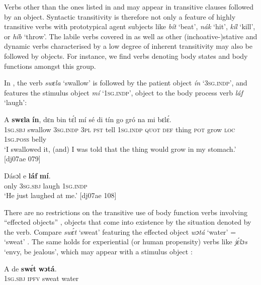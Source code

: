 Verbs other than the ones listed in  and  may appear in transitive clauses followed by an object. Syntactic transitivity is therefore not only a feature of highly transitive verbs with prototypical agent subjects like \textit{bít} ‘beat’, \textit{nák} ‘hit’, \textit{kíl} ‘kill’, or \textit{híb} ‘throw’. The labile verbs covered in  as well as other (inchoative-)stative and dynamic verbs characterised by a low degree of inherent transitivity may also be followed by objects. For instance, we find verbs denoting body states and body functions amongst this group.


In , the verb \textit{swɛla} ‘swallow’ is followed by the patient object \textit{ín} ‘\textsc{3sg.indp}’, and  features the stimulus object \textit{mí} ‘\textsc{1sg.indp}’, object to the body process verb \textit{láf} ‘laugh’: 



\ea%
    \label{ex:key:1101}
    \gll A    \textbf{swɛla}  \textbf{ín},    dɛn  bin  tɛ́l  mí    sé
di  tín    go  gró  na  mi    bɛlɛ́.\\
\textsc{1sg.sbj}  swallow  \textsc{3sg.indp}  \textsc{3pl}  \textsc{pst}  tell  \textsc{1sg.indp}  \textsc{quot}
\textsc{def}  thing  \textsc{pot} grow  \textsc{loc}  \textsc{1sg.poss}  belly\\

\glt ‘I swallowed it, (and) I was told that the thing would grow in my stomach.’ [dj07ae 079]
\z


\ea%
    \label{ex:key:1102}
    \gll Dásɔl  e    \textbf{láf}    \textbf{mí}.\\
only    \textsc{3sg.sbj}  laugh  \textsc{1sg.indp}\\

\glt ‘He just laughed at me.’ [dj07ae 108]
\z

There are no restrictions on the transitive use of body function verbs involving “effected objects{\fff}” \citep{Hopper1985}, objects that come into existence by the situation denoted by the verb. Compare \textit{swɛ́t} ‘sweat’ featuring the effected object{\fff} \textit{wɔtá} ‘water’ = ‘sweat’ . The same holds for experiential (or human propensity) verbs like \textit{jɛ́lɔs} ‘envy, be jealous’, which may appear with a stimulus object : 


\ea%
    \label{ex:key:1103}
    \gll A    de    \textbf{swɛ́t}  \textbf{wɔtá}.\\
\textsc{1sg.sbj}  \textsc{ipfv}    sweat  water\\

